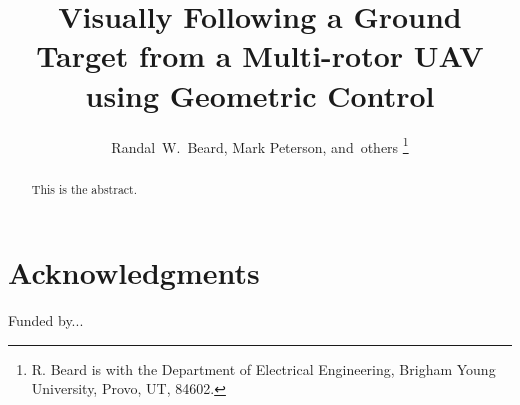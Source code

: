 \documentclass{article}
\begin{document}
\title{Visually Following a Ground Target from a Multi-rotor UAV using Geometric Control}
\author{Randal~W.~Beard, Mark Peterson,
        and~others %
\thanks{R. Beard is with the Department of Electrical Engineering, Brigham Young University, Provo, UT, 84602.}%
	}

\maketitle

\begin{abstract}

This is the abstract.
\end{abstract}









\section*{Acknowledgments}
Funded by...



\end{document}
